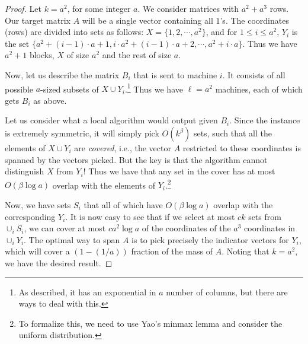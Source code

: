 \documentclass{article}
\begin{document}
\begin{proof}
Let $k = a^2$, for some integer $a$.  We consider matrices with $a^2 + a^3$ rows.  Our target matrix $A$ will be a single vector containing all $1$'s.  The coordinates (rows) are divided into sets as follows: $X = \{1, 2, \cdots, a^2\}$, and for $1 \leq i \leq a^2$, $Y_i$ is the set $\{a^2 + (i-1) \cdot a + 1, i \cdot a^2 + (i-1) \cdot a + 2, \cdots, a^2 + i \cdot a\}$.  Thus we have $a^2 + 1$ blocks, $X$ of size $a^2$ and the rest of size $a$.

Now, let us describe the matrix $B_i$ that is sent to machine $i$.  It consists of all possible $a$-sized subsets of $X \cup Y_i$.\footnote{As described, it has an exponential in $a$ number of columns, but there are ways to deal with this.}  Thus we have $\ell = a^2$ machines, each of which gets $B_i$ as above.

Let us consider what a local algorithm would output given $B_i$.  Since the instance is extremely symmetric, it will simply pick $O(k^{\beta})$ sets, such that all the elements of $X \cup Y_i$ are {\em covered}, i.e., the vector $A$ restricted to these coordinates is spanned by the vectors picked. But the key is that the algorithm cannot distinguish $X$ from $Y_i$! Thus we have that any set in the cover has at most $O(\beta \log a)$ overlap with the elements of $Y_i$.\footnote{To formalize this, we need to use Yao's minmax lemma and consider the uniform distribution.}

Now, we have sets $S_i$ that all of which have $O(\beta \log a)$ overlap with the corresponding $Y_i$.  It is now easy to see that if we select at most $ck$ sets from $\cup_i S_i$, we can cover at most $c a^2 \log a$ of the coordinates of the $a^3$ coordinates in $\cup_i Y_i$. The optimal way to span $A$ is to pick precisely the indicator vectors for $Y_i$, which will cover a $(1-(1/a))$ fraction of the mass of $A$.  Noting that $k = a^2$, we have the desired result.
\iffalse
We construct the set of columns $A_i$ based on $X$ and $Y_i$ as follows. 
We put $a^2 + a^3$ rows in $A$ one for each number in $X \cup Y_1 \cup Y_2 \cdots Y_{a^2}$.
We set the number of machines $m$ to be equal to $k = a^2$.
For any size $a$ subset $S \subset X \cup Y_i$, we put an indicator column $1_S$ in $A_i$ with $a$ ones in entries that belong to $S$, and zeros elsewhere. 
Finally we set $B$ to be just one column with all its entries equal to one. The symmetry we observe in each machine makes any algorithm unable to distinguish between entries in $X$ and entries in $Y_i$. Therefore in expectation every selected column will have at most $log(a)$ non-zero entries in $Y_i$. Therefore we can say with high probability each column in $S_i$ has at most $log(a)$ non-zero entries in $Y_i$ since $S_i$ has size at most $k^{\beta}$ (polynomial in $k$). So in the pool of selected columns $\cup_{i=1}^m S_i$ with high probability each column has at most $log(a) \leq log(k)$ non-zero entries in $\cup_{i=1}^m Y_i$. So any subset of  $c \cdots k$ columns among the selected columns will not cover more than $c \cdot k log(k)$ entries of the $a^3 = k\sqrt{k}$ entries of $\cup_{i=1}^m Y_i$. The proof completes by observing that $1-\frac{1}{k}$ fraction of entries of $B$ are in $\cup_{i=1}^m Y_i$. 
\fi
\end{proof}
\end{document}
